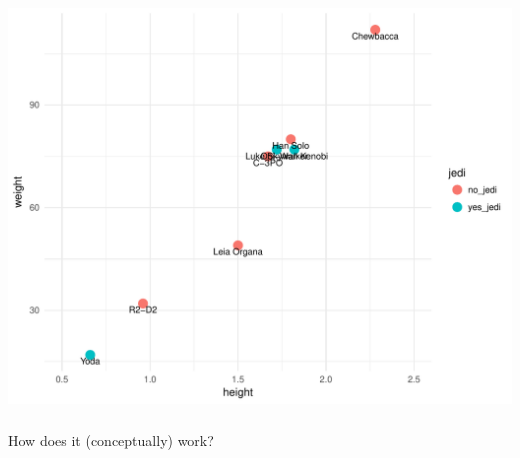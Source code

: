 \documentclass[12pt]{beamer}\usepackage[]{graphicx}\usepackage[]{color}
\makeatletter
\def\maxwidth{ %
  \ifdim\Gin@nat@width>\linewidth
    \linewidth
  \else
    \Gin@nat@width
  \fi
}
\newenvironment{knitrout}{}{} %
\makeatother
\begin{document}

\begin{frame}[fragile]
\frametitle{}

\begin{knitrout}\footnotesize
{}\color{fgcolor}

{\centering \includegraphics[width=\maxwidth]{figure/scatterplot3-1} 

}



\end{knitrout}

\end{frame}


\begin{frame}
\frametitle{}

\Large How does it {\lolit (conceptually)} work?

\end{frame}


\begin{frame}
\begin{center}
\end{center}
\end{frame}

\end{document}
